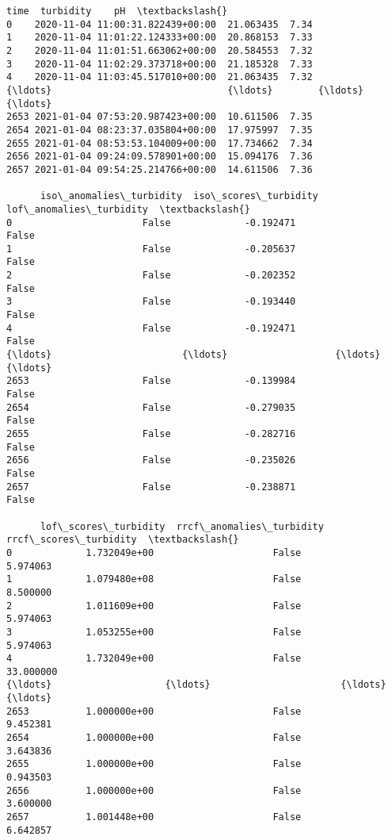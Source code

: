             \begin{tcolorbox}[breakable, size=fbox, boxrule=.5pt, pad at break*=1mm, opacityfill=0]
\begin{Verbatim}[commandchars=\\\{\}]
                                 time  turbidity    pH  \textbackslash{}
0    2020-11-04 11:00:31.822439+00:00  21.063435  7.34
1    2020-11-04 11:01:22.124333+00:00  20.868153  7.33
2    2020-11-04 11:01:51.663062+00:00  20.584553  7.32
3    2020-11-04 11:02:29.373718+00:00  21.185328  7.33
4    2020-11-04 11:03:45.517010+00:00  21.063435  7.32
{\ldots}                               {\ldots}        {\ldots}   {\ldots}
2653 2021-01-04 07:53:20.987423+00:00  10.611506  7.35
2654 2021-01-04 08:23:37.035804+00:00  17.975997  7.35
2655 2021-01-04 08:53:53.104009+00:00  17.734662  7.34
2656 2021-01-04 09:24:09.578901+00:00  15.094176  7.36
2657 2021-01-04 09:54:25.214766+00:00  14.611506  7.36

      iso\_anomalies\_turbidity  iso\_scores\_turbidity  lof\_anomalies\_turbidity  \textbackslash{}
0                       False             -0.192471                    False
1                       False             -0.205637                    False
2                       False             -0.202352                    False
3                       False             -0.193440                    False
4                       False             -0.192471                    False
{\ldots}                       {\ldots}                   {\ldots}                      {\ldots}
2653                    False             -0.139984                    False
2654                    False             -0.279035                    False
2655                    False             -0.282716                    False
2656                    False             -0.235026                    False
2657                    False             -0.238871                    False

      lof\_scores\_turbidity  rrcf\_anomalies\_turbidity  rrcf\_scores\_turbidity  \textbackslash{}
0             1.732049e+00                     False               5.974063
1             1.079480e+08                     False               8.500000
2             1.011609e+00                     False               5.974063
3             1.053255e+00                     False               5.974063
4             1.732049e+00                     False              33.000000
{\ldots}                    {\ldots}                       {\ldots}                    {\ldots}
2653          1.000000e+00                     False               9.452381
2654          1.000000e+00                     False               3.643836
2655          1.000000e+00                     False               0.943503
2656          1.000000e+00                     False               3.600000
2657          1.001448e+00                     False               6.642857


\end{Verbatim}
\end{tcolorbox}
